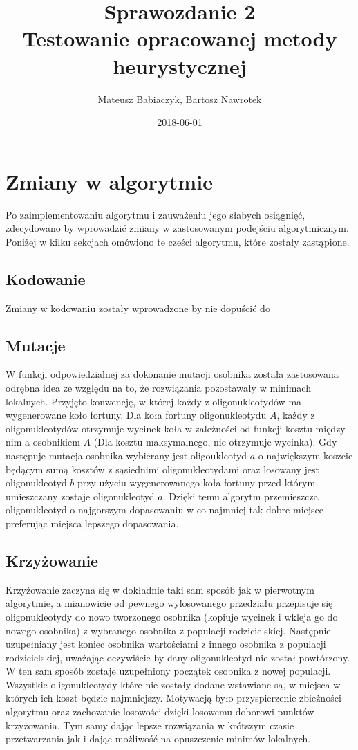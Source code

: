 \documentclass{article}
\title{Sprawozdanie 2 \\ Testowanie opracowanej metody heurystycznej}
\date{2018-06-01}
\author{Mateusz Babiaczyk, Bartosz Nawrotek}
\begin{document}
\maketitle
\section{Zmiany w algorytmie}  
Po zaimplementowaniu algorytmu i zauważeniu jego słabych osiągnięć, zdecydowano by wprowadzić zmiany w zastosowanym podejściu algorytmicznym. Poniżej w kilku sekcjach omówiono te cześci algorytmu, które zostały zastąpione.
\subsection{Kodowanie}
Zmiany w kodowaniu zostały wprowadzone by nie dopuścić do %
\subsection{Mutacje}
W funkcji odpowiedzialnej za dokonanie mutacji osobnika została zastosowana odrębna idea ze względu na to, że rozwiązania pozostawały w minimach lokalnych. Przyjęto konwencję, w której każdy z oligonukleotydów ma wygenerowane koło fortuny. Dla koła fortuny oligonukleotydu $A$, każdy z oligonukleotydów otrzymuje wycinek koła w zależności od funkcji kosztu między nim a osobnikiem $A$ (Dla kosztu maksymalnego, nie otrzymuje wycinka). Gdy następuje mutacja osobnika wybierany jest oligoukleotyd $a$ o największym koszcie będącym sumą kosztów z sąsiednimi oligonukleotydami oraz losowany jest oligonukleotyd $b$ przy użyciu wygenerowanego koła fortuny przed którym umieszczany zostaje oligonukleotyd $a$. Dzięki temu algorytm przemieszcza oligonukleotyd o najgorszym dopasowaniu w co najmniej tak dobre miejsce preferując miejsca lepszego dopasowania.
\subsection{Krzyżowanie}
Krzyżowanie zaczyna się w dokładnie taki sam sposób jak w pierwotnym algorytmie, a mianowicie od pewnego wylosowanego przedziału przepisuje się oligonukleotydy do nowo tworzonego osobnika (kopiuje wycinek i wkleja go do nowego osobnika) z wybranego osobnika z populacji rodzicielskiej. Następnie uzupełniany jest koniec osobnika wartościami z innego osobnika z populacji rodzicielskiej, uważając oczywiście by dany oligonukleotyd nie został powtórzony. W ten sam sposób zostaje uzupełniony początek osobnika z nowej populacji. \\ Wszystkie oligonukleotydy które nie zostały dodane wstawiane są, w miejsca w których ich koszt będzie najmniejszy. Motywacją było przyspierzenie zbieżności algorytmu oraz zachowanie losowości dzięki losowemu doborowi punktów krzyżowania. Tym samy dając lepsze rozwiązania w krótszym czasie przetwarzania jak i dając możliwość na opuszczenie minimów lokalnych.
\end{document}
